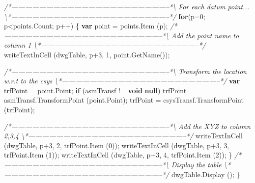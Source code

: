 \documentclass[]{article}
\newenvironment{Shaded}{}{}
\newcommand{\KeywordTok}[1]{\textcolor[rgb]{0.00,0.44,0.13}{\textbf{{#1}}}}
\newcommand{\DecValTok}[1]{\textcolor[rgb]{0.25,0.63,0.44}{{#1}}}
\newcommand{\CommentTok}[1]{\textcolor[rgb]{0.38,0.63,0.69}{\textit{{#1}}}}
\newcommand{\OtherTok}[1]{\textcolor[rgb]{0.00,0.44,0.13}{{#1}}}
\newcommand{\FunctionTok}[1]{\textcolor[rgb]{0.02,0.16,0.49}{{#1}}}
\newcommand{\NormalTok}[1]{{#1}}
\begin{document}
\begin{Shaded}
\begin{Highlighting}[]
\CommentTok{/*--------------------------------------------------------------------*\textbackslash{} }
\CommentTok{  For each datum point...}
\CommentTok{\textbackslash{}*--------------------------------------------------------------------*/}    
  \KeywordTok{for}\NormalTok{(p=}\DecValTok{0}\NormalTok{; p<}\OtherTok{points}\NormalTok{.}\FunctionTok{Count}\NormalTok{; p++)}
    \NormalTok{\{ }
      \KeywordTok{var} \NormalTok{point = }\OtherTok{points}\NormalTok{.}\FunctionTok{Item} \NormalTok{(p);}
\CommentTok{/*--------------------------------------------------------------------*\textbackslash{}    }
\CommentTok{  Add the point name to column 1}
\CommentTok{\textbackslash{}*--------------------------------------------------------------------*/}   
      \FunctionTok{writeTextInCell} \NormalTok{(dwgTable, p}\DecValTok{+3}\NormalTok{, }\DecValTok{1}\NormalTok{, }\OtherTok{point}\NormalTok{.}\FunctionTok{GetName}\NormalTok{());}
      
\CommentTok{/*--------------------------------------------------------------------*\textbackslash{}   }
\CommentTok{ Transform the location w.r.t to the csys}
\CommentTok{\textbackslash{}*--------------------------------------------------------------------*/}
      \KeywordTok{var} \NormalTok{trfPoint = }\OtherTok{point}\NormalTok{.}\FunctionTok{Point}\NormalTok{;}
      \KeywordTok{if} \NormalTok{(asmTransf != }\KeywordTok{void} \KeywordTok{null}\NormalTok{)}
    \NormalTok{trfPoint = }\OtherTok{asmTransf}\NormalTok{.}\FunctionTok{TransformPoint} \NormalTok{(}\OtherTok{point}\NormalTok{.}\FunctionTok{Point}\NormalTok{);}
      \NormalTok{trfPoint = }\OtherTok{csysTransf}\NormalTok{.}\FunctionTok{TransformPoint} \NormalTok{(trfPoint);}

\CommentTok{/*--------------------------------------------------------------------*\textbackslash{}   }
\CommentTok{  Add the XYZ to column 2,3,4}
\CommentTok{\textbackslash{}*--------------------------------------------------------------------*/}   
      \FunctionTok{writeTextInCell} \NormalTok{(dwgTable, p}\DecValTok{+3}\NormalTok{, }\DecValTok{2}\NormalTok{, }\OtherTok{trfPoint}\NormalTok{.}\FunctionTok{Item} \NormalTok{(}\DecValTok{0}\NormalTok{));}
      \FunctionTok{writeTextInCell} \NormalTok{(dwgTable, p}\DecValTok{+3}\NormalTok{, }\DecValTok{3}\NormalTok{, }\OtherTok{trfPoint}\NormalTok{.}\FunctionTok{Item} \NormalTok{(}\DecValTok{1}\NormalTok{));}
      \FunctionTok{writeTextInCell} \NormalTok{(dwgTable, p}\DecValTok{+3}\NormalTok{, }\DecValTok{4}\NormalTok{, }\OtherTok{trfPoint}\NormalTok{.}\FunctionTok{Item} \NormalTok{(}\DecValTok{2}\NormalTok{));   }
    \NormalTok{\}}
\CommentTok{/*--------------------------------------------------------------------*\textbackslash{}  }
\CommentTok{  Display the table}
\CommentTok{\textbackslash{}*--------------------------------------------------------------------*/}
  \OtherTok{dwgTable}\NormalTok{.}\FunctionTok{Display} \NormalTok{();}
\NormalTok{\}}
 

\end{Highlighting}
\end{Shaded}
\end{document}
